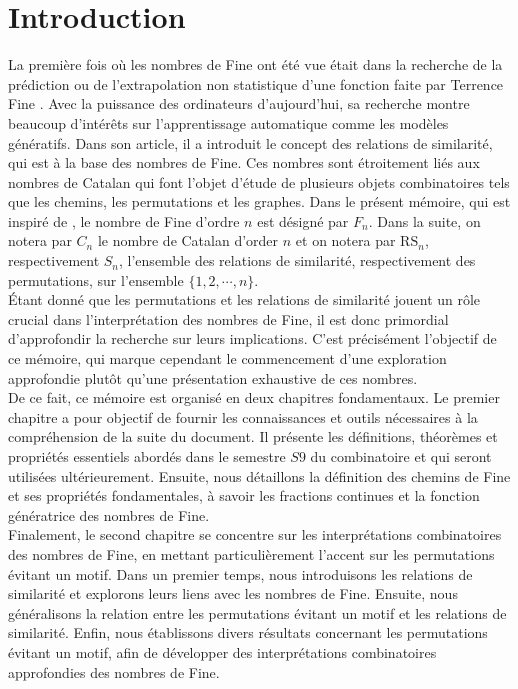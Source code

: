 \begingroup
\renewcommand{\thechapter}{}
\chapter{Introduction}
\endgroup

La première fois où les nombres de Fine ont été vue était dans la recherche de la prédiction ou de l'extrapolation non statistique d'une fonction faite par Terrence Fine \cite{TFine}. Avec la puissance des ordinateurs d'aujourd'hui, sa recherche montre beaucoup d'intérêts sur l'apprentissage automatique comme les modèles génératifs. Dans son article, il a introduit le concept des relations de similarité, qui est à la base des nombres de Fine.
Ces nombres sont étroitement liés aux nombres de Catalan qui font l'objet d'étude de plusieurs objets combinatoires tels que les chemins, les permutations et les graphes. Dans le présent mémoire, qui est inspiré de \cite{RRP}, le nombre de Fine d'ordre $n$ est désigné par $F_{n}$. Dans la suite, on notera par $C_{n}$ le nombre de Catalan d'order $n$ et on notera par $\text{RS}_{n}$, respectivement $S_{n}$, l'ensemble des relations de similarité, respectivement des permutations, sur l'ensemble $\{1, 2, \cdots, n\}$.\\

Étant donné que les permutations et les relations de similarité jouent un rôle crucial dans l'interprétation des nombres de Fine, il est donc primordial d'approfondir la recherche sur leurs implications. C'est précisément l'objectif de ce mémoire, qui marque cependant le commencement d'une exploration approfondie plutôt qu'une présentation exhaustive de ces nombres. \\

De ce fait, ce mémoire est organisé en deux chapitres fondamentaux. Le premier chapitre a pour objectif de fournir les connaissances et outils nécessaires à la compréhension de la suite du document. Il présente les définitions, théorèmes et propriétés essentiels abordés dans le semestre $S9$ du combinatoire et qui seront utilisées ultérieurement. Ensuite, nous détaillons la définition des chemins de Fine et ses propriétés fondamentales, à savoir les fractions continues et la fonction génératrice des nombres de Fine. \vspace*{5pt}\\

Finalement, le second chapitre se concentre sur les interprétations combinatoires des nombres de Fine, en mettant particulièrement l'accent sur les permutations évitant un motif. Dans un premier temps, nous introduisons les relations de similarité et explorons leurs liens avec les nombres de Fine. Ensuite, nous généralisons la relation entre les permutations évitant un motif et les relations de similarité. Enfin, nous établissons divers résultats concernant les permutations évitant un motif, afin de développer des interprétations combinatoires approfondies des nombres de Fine.\\
\newpage


